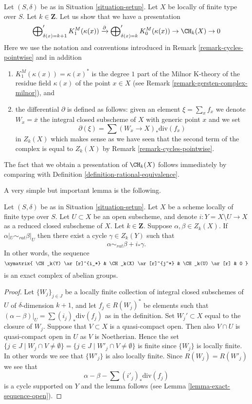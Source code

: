 \begin{remark}
\label{remark-chow-group-pointwise}
Let $(S, \delta)$ be as in Situation \ref{situation-setup}.
Let $X$ be locally of finite type over $S$. Let $k \in \mathbf{Z}$.
Let us show that we have a presentation
$$
\bigoplus'\nolimits_{\delta(x) = k + 1} K_1^M(\kappa(x))
\xrightarrow{\partial}
\bigoplus'\nolimits_{\delta(x) = k} K_0^M(\kappa(x)) \to
\CH_k(X) \to 0
$$
Here we use the notation and conventions introduced in
Remark \ref{remark-cycles-pointwise} and in addition
\begin{enumerate}
\item $K_1^M(\kappa(x)) = \kappa(x)^*$ is the degree $1$ part of
the Milnor K-theory of the residue field $\kappa(x)$ of the point
$x \in X$ (see Remark \ref{remark-gersten-complex-milnor}), and
\item the differential $\partial$ is defined as follows:
given an element $\xi = \sum_x f_x$ we denote $W_x = \overline{x}$
the integral closed subscheme of $X$ with generic point $x$ and we set
$$
\partial(\xi) = \sum (W_x \to X)_*\text{div}(f_x)
$$
in $Z_k(X)$ which makes sense as we have seen that the second
term of the complex is equal to $Z_k(X)$ by
Remark \ref{remark-cycles-pointwise}.
\end{enumerate}
The fact that we obtain a presentation of $\CH_k(X)$ follows
immediately by comparing with Definition \ref{definition-rational-equivalence}.
\end{remark}

\noindent
A very simple but important lemma is the following.

\begin{lemma}
\label{lemma-restrict-to-open}
Let $(S, \delta)$ be as in Situation \ref{situation-setup}.
Let $X$ be a scheme locally of finite type over $S$.
Let $U \subset X$ be an open subscheme, and denote
$i : Y = X \setminus U \to X$ as a reduced closed subscheme of $X$.
Let $k \in \mathbf{Z}$.
Suppose $\alpha, \beta \in Z_k(X)$.
If $\alpha|_U \sim_{rat} \beta|_U$ then there exist a cycle
$\gamma \in Z_k(Y)$ such that
$$
\alpha \sim_{rat} \beta + i_*\gamma.
$$
In other words, the sequence
$$
\xymatrix{
\CH_k(Y) \ar[r]^{i_*} & \CH_k(X) \ar[r]^{j^*} & \CH_k(U) \ar[r] & 0
}
$$
is an exact complex of abelian groups.
\end{lemma}

\begin{proof}
Let $\{W_j\}_{j \in J}$ be a locally finite collection of integral closed
subschemes of $U$ of $\delta$-dimension $k + 1$, and let $f_j \in R(W_j)^*$
be elements such that $(\alpha - \beta)|_U = \sum (i_j)_*\text{div}(f_j)$
as in the definition. Set $W_j' \subset X$ equal
to the closure of $W_j$. Suppose that $V \subset X$ is a quasi-compact
open. Then also $V \cap U$ is quasi-compact open in $U$ as
$V$ is Noetherian. Hence the set
$\{j \in J \mid W_j \cap V \not = \emptyset\}
= \{j \in J \mid W'_j \cap V \not = \emptyset\}$
is finite since $\{W_j\}$ is locally finite. In other words we see that
$\{W'_j\}$ is also locally finite. Since $R(W_j) = R(W'_j)$ we see
that
$$
\alpha - \beta - \sum (i'_j)_*\text{div}(f_j)
$$
is a cycle supported on $Y$ and the lemma follows (see
Lemma \ref{lemma-exact-sequence-open}).
\end{proof}


